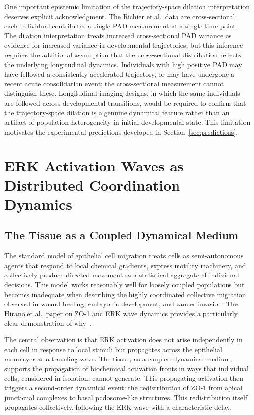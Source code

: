 \documentclass[11pt,a4paper]{article}
\theoremstyle{plain}
\theoremstyle{definition}
\begin{document}
One important epistemic limitation of the trajectory-space dilation interpretation
deserves explicit acknowledgment. The Richier et al.\ data are cross-sectional: each
individual contributes a single PAD measurement at a single time point. The dilation
interpretation treats increased cross-sectional PAD variance as evidence for increased
variance in developmental trajectories, but this inference requires the additional
assumption that the cross-sectional distribution reflects the underlying longitudinal
dynamics. Individuals with high positive PAD may have followed a consistently
accelerated trajectory, or may have undergone a recent acute consolidation event; the
cross-sectional measurement cannot distinguish these. Longitudinal imaging designs,
in which the same individuals are followed across developmental transitions, would be
required to confirm that the trajectory-space dilation is a genuine dynamical feature
rather than an artifact of population heterogeneity in initial developmental state.
This limitation motivates the experimental predictions developed in Section~\ref{sec:predictions}.

\section{ERK Activation Waves as Distributed Coordination Dynamics}
\label{sec:erk}

\subsection{The Tissue as a Coupled Dynamical Medium}

The standard model of epithelial cell migration treats cells as semi-autonomous agents
that respond to local chemical gradients, express motility machinery, and collectively
produce directed movement as a statistical aggregate of individual decisions. This model
works reasonably well for loosely coupled populations but becomes inadequate when
describing the highly coordinated collective migration observed in wound healing,
embryonic development, and cancer invasion. The Hirano et al.\ paper on ZO-1 and ERK
wave dynamics provides a particularly clear demonstration of why~\cite{Hirano2026}.

The central observation is that ERK activation does not arise independently in each cell
in response to local stimuli but propagates across the epithelial monolayer as a traveling
wave. The tissue, as a coupled dynamical medium, supports the propagation of biochemical
activation fronts in ways that individual cells, considered in isolation, cannot generate.
This propagating activation then triggers a second-order dynamical event: the redistribution
of ZO-1 from apical junctional complexes to basal podosome-like structures. This
redistribution itself propagates collectively, following the ERK wave with a characteristic
delay.
\end{document}
